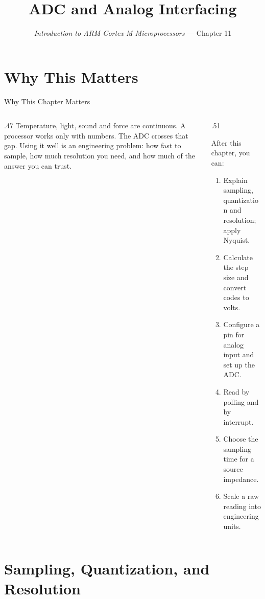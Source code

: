 \documentclass[9pt,aspectratio=169,xcolor=table]{beamer}
\title{ADC and Analog Interfacing}
\subtitle{\emph{Introduction to ARM Cortex-M Microprocessors} --- Chapter 11}
\begin{document}
\titlepage

\section{Why This Matters}

\begin{frame}{Why This Chapter Matters}
    \begin{columns}[T]
    \begin{column}{.47\textwidth}
        {\normalsize Temperature, light, sound and force are continuous. A processor works only with numbers. The ADC crosses that gap. Using it well is an engineering problem: how fast to sample, how much resolution you need, and how much of the answer you can trust.}
    \end{column}
    \begin{column}{.51\textwidth}
        \begin{block}{After this chapter, you can:}
        {\small
        \begin{enumerate}\itemsep2pt
            \item Explain sampling, quantization and resolution; apply Nyquist.
            \item Calculate the step size and convert codes to volts.
            \item Configure a pin for analog input and set up the ADC.
            \item Read by polling and by interrupt.
            \item Choose the sampling time for a source impedance.
            \item Scale a raw reading into engineering units.
        \end{enumerate}}
        \end{block}
    \end{column}
    \end{columns}
\end{frame}


\section{Sampling, Quantization, and Resolution}
\end{document}
